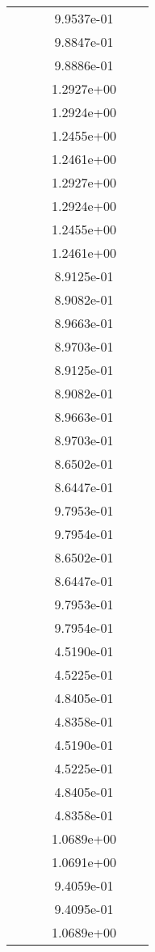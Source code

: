 \begin{xltabular}{\textwidth}{r|rS[table-format=1.3e+2]S[table-format=1.4e+2]S[table-format=1.4e+2]S[table-format=-1.5]}
&  &  & 9.9537e-01 & & \\
&  &  & 9.8847e-01 & & \\
&  &  & 9.8886e-01 & & \\
&  &  & 1.2927e+00 & & \\
&  &  & 1.2924e+00 & & \\
&  &  & 1.2455e+00 & & \\
&  &  & 1.2461e+00 & & \\
&  &  & 1.2927e+00 & & \\
&  &  & 1.2924e+00 & & \\
&  &  & 1.2455e+00 & & \\
&  &  & 1.2461e+00 & & \\
&  &  & 8.9125e-01 & & \\
&  &  & 8.9082e-01 & & \\
&  &  & 8.9663e-01 & & \\
&  &  & 8.9703e-01 & & \\
&  &  & 8.9125e-01 & & \\
&  &  & 8.9082e-01 & & \\
&  &  & 8.9663e-01 & & \\
&  &  & 8.9703e-01 & & \\
&  &  & 8.6502e-01 & & \\
&  &  & 8.6447e-01 & & \\
&  &  & 9.7953e-01 & & \\
&  &  & 9.7954e-01 & & \\
&  &  & 8.6502e-01 & & \\
&  &  & 8.6447e-01 & & \\
&  &  & 9.7953e-01 & & \\
&  &  & 9.7954e-01 & & \\
&  &  & 4.5190e-01 & & \\
&  &  & 4.5225e-01 & & \\
&  &  & 4.8405e-01 & & \\
&  &  & 4.8358e-01 & & \\
&  &  & 4.5190e-01 & & \\
&  &  & 4.5225e-01 & & \\
&  &  & 4.8405e-01 & & \\
&  &  & 4.8358e-01 & & \\
&  &  & 1.0689e+00 & & \\
&  &  & 1.0691e+00 & & \\
&  &  & 9.4059e-01 & & \\
&  &  & 9.4095e-01 & & \\
&  &  & 1.0689e+00 & & \\

\end{xltabular}
